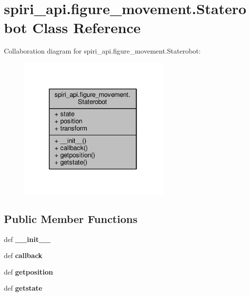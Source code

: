 \hypertarget{classspiri__api_1_1figure__movement_1_1_staterobot}{\section{spiri\-\_\-api.\-figure\-\_\-movement.\-Staterobot Class Reference}
\label{classspiri__api_1_1figure__movement_1_1_staterobot}
}


Collaboration diagram for spiri\-\_\-api.\-figure\-\_\-movement.\-Staterobot\-:
\nopagebreak
\begin{figure}[H]
\begin{center}
\leavevmode
\includegraphics[width=214pt]{classspiri__api_1_1figure__movement_1_1_staterobot__coll__graph}
\end{center}
\end{figure}
\subsection*{Public Member Functions}
\begin{DoxyCompactItemize}
\item 
\hypertarget{classspiri__api_1_1figure__movement_1_1_staterobot_a4bca047e67a87ef60147caa3bec0bfa5}{def {\bfseries \-\_\-\-\_\-init\-\_\-\-\_\-}}\label{classspiri__api_1_1figure__movement_1_1_staterobot_a4bca047e67a87ef60147caa3bec0bfa5}

\item 
\hypertarget{classspiri__api_1_1figure__movement_1_1_staterobot_a321456867de643d09326b856aeec975b}{def {\bfseries callback}}\label{classspiri__api_1_1figure__movement_1_1_staterobot_a321456867de643d09326b856aeec975b}

\item 
\hypertarget{classspiri__api_1_1figure__movement_1_1_staterobot_a745991fc1e78f37812e0065ea177ec53}{def {\bfseries getposition}}\label{classspiri__api_1_1figure__movement_1_1_staterobot_a745991fc1e78f37812e0065ea177ec53}

\item 
\hypertarget{classspiri__api_1_1figure__movement_1_1_staterobot_aa92049eb8526decb28cfa8d34aaa6043}{def {\bfseries getstate}}\label{classspiri__api_1_1figure__movement_1_1_staterobot_aa92049eb8526decb28cfa8d34aaa6043}

\end{DoxyCompactItemize}
